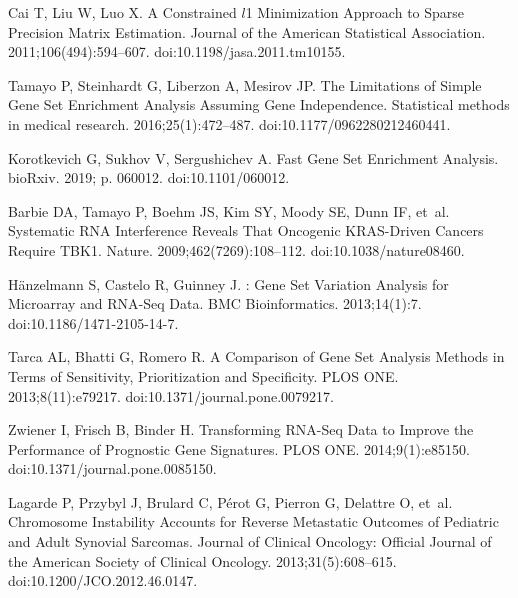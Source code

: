 \documentclass[10pt,letterpaper]{article}
\begin{document}
\begin{thebibliography}{10}
	Cai T, Liu W, Luo X.
	\newblock A {{Constrained}} {$l$}1 {{Minimization Approach}} to
	{{Sparse Precision Matrix Estimation}}.
	\newblock Journal of the American Statistical Association.
	2011;106(494):594--607.
	\newblock doi:{10.1198/jasa.2011.tm10155}.
	
	Tamayo P, Steinhardt G, Liberzon A, Mesirov JP.
	\newblock The {{Limitations}} of {{Simple Gene Set Enrichment Analysis Assuming
			Gene Independence}}.
	\newblock Statistical methods in medical research. 2016;25(1):472--487.
	\newblock doi:{10.1177/0962280212460441}.
	
	Korotkevich G, Sukhov V, Sergushichev A.
	\newblock Fast Gene Set Enrichment Analysis.
	\newblock bioRxiv. 2019; p. 060012.
	\newblock doi:{10.1101/060012}.
	
	Barbie DA, Tamayo P, Boehm JS, Kim SY, Moody SE, Dunn IF, et~al.
	\newblock Systematic {{RNA}} Interference Reveals That Oncogenic
	{{KRAS}}-Driven Cancers Require {{TBK1}}.
	\newblock Nature. 2009;462(7269):108--112.
	\newblock doi:{10.1038/nature08460}.
	
	H{\"a}nzelmann S, Castelo R, Guinney J.
	: Gene Set Variation Analysis for Microarray and
	{{RNA}}-{{Seq}} Data.
	\newblock BMC Bioinformatics. 2013;14(1):7.
	\newblock doi:{10.1186/1471-2105-14-7}.
	
	Tarca AL, Bhatti G, Romero R.
	\newblock A {{Comparison}} of {{Gene Set Analysis Methods}} in {{Terms}} of
	{{Sensitivity}}, {{Prioritization}} and {{Specificity}}.
	\newblock PLOS ONE. 2013;8(11):e79217.
	\newblock doi:{10.1371/journal.pone.0079217}.
	
	Zwiener I, Frisch B, Binder H.
	\newblock Transforming {{RNA}}-{{Seq Data}} to {{Improve}} the {{Performance}}
	of {{Prognostic Gene Signatures}}.
	\newblock PLOS ONE. 2014;9(1):e85150.
	\newblock doi:{10.1371/journal.pone.0085150}.
	
	Lagarde P, Przybyl J, Brulard C, P{\'e}rot G, Pierron G, Delattre O, et~al.
	\newblock Chromosome Instability Accounts for Reverse Metastatic Outcomes of
	Pediatric and Adult Synovial Sarcomas.
	\newblock Journal of Clinical Oncology: Official Journal of the American
	Society of Clinical Oncology. 2013;31(5):608--615.
	\newblock doi:{10.1200/JCO.2012.46.0147}.
	

\end{thebibliography}
\end{document}
